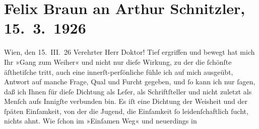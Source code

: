 

         
         \renewcommand{\erwaehntePersonen}{Personen: Felix Braun, Johann Wolfgang von Goethe}
         \renewcommand{\erwaehnteOrte}{Orte: Badisches Staatstheater, Karlsruhe, Wien}
         \renewcommand{\erwaehnteWerke}{Werke: Der Gang zum Weiher. Dramatische Dichtung, Der einsame Weg. Schauspiel in fünf Akten, Komödie der Verführung. In drei Akten, Tantalos}
               \section[Felix Braun an Arthur Schnitzler, 15. 3. 1926]{ Felix Braun an Arthur Schnitzler, 15. 3. 1926}\nopagebreak{}\rehead{ }\begin{ledgroupsized}[t]{13cm}\normalsize\beginnumbering \toendnotes[C]{\smallbreak\pagebreak[2]} 
\toendnotes[C]{\smallbreak}\pstart
           \centering{}{\pb}Wien, den 15. III. 26\pend
           \pstart{}Verehrter Herr Doktor!\pend\pstart
           Tief ergriffen und bewegt hat mich Ihr »Gang zum
                  Weiher« und nicht nur dieſe Wirkung, zu der die ſchönſte äſthetiſche tritt,
               auch eine innerſt-perſönliche fühle ich auf mich ausgeübt, Antwort auf manche Frage,
               Qual und Furcht gegeben, und ſo kann ich nur ſagen, daß ich Ihnen für dieſe Dichtung
               als Leſer, als Schriftſteller und nicht zuletzt als Menſch aufs Innigſte verbunden
               bin.\pend
           \pstart
           Es iſt eine Dichtung der Weisheit und der ſpäten Einſamkeit, von der die Jugend, die
               Einſamkeit ſo leidenſchaftlich ſucht, nichts {\pb}ahnt.
               Wie ſchon im »Einſamen Weg« und neuerdings in

\end{ledgroupsized}
